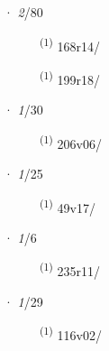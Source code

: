 \noindent{} · \textit{2}/80 \LEMMALINE
\begin{description}
    \item[]  \textsuperscript{(1)} \mbox{168r14/}
    \item[]  \textsuperscript{(1)} \mbox{199r18/}
\end{description}
\ENTRYEND
\noindent{} · \textit{1}/30 \LEMMALINE
\begin{description}
    \item[]  \textsuperscript{(1)} \mbox{206v06/}
\end{description}
\ENTRYEND
\noindent{} · \textit{1}/25 \LEMMALINE
\begin{description}
    \item[]  \textsuperscript{(1)} \mbox{49v17/}
\end{description}
\ENTRYEND
\noindent{} · \textit{1}/6 \LEMMALINE
\begin{description}
    \item[]  \textsuperscript{(1)} \mbox{235r11/}
\end{description}
\ENTRYEND
\noindent{} · \textit{1}/29 \LEMMALINE
\begin{description}
    \item[]  \textsuperscript{(1)} \mbox{116v02/}
\end{description}
\ENTRYEND
